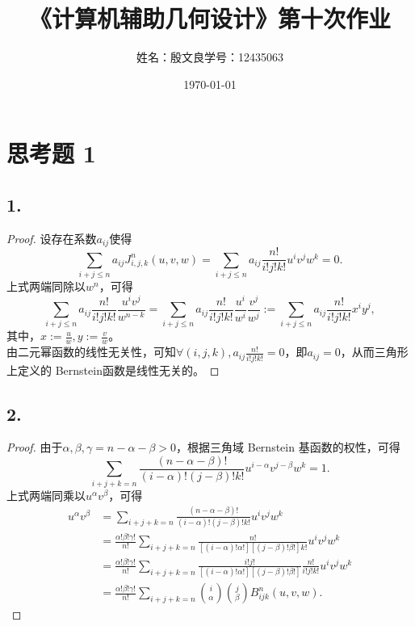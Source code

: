 \documentclass[utf8]{ctexart}
\title{《计算机辅助几何设计》第十次作业}
\author{姓名：殷文良\qquad 学号：12435063}
\date{\today}
\begin{document}
\maketitle
\section*{思考题 1}
\subsection*{1.}
\begin{proof}
    设存在系数$a_{ij}$使得
    $$
    \sum_{i+j\leq n}a_{ij}J_{i,j,k}^n(u,v,w) = \sum_{i+j\leq n}a_{ij}\frac{n!}{i!j!k!}u^iv^jw^k = 0.
    $$
    上式两端同除以$w^n$，可得
    $$
    \sum_{i+j\leq n}a_{ij}\frac{n!}{i!j!k!}\frac{u^iv^j}{w^{n-k}} = \sum_{i+j\leq n}a_{ij}\frac{n!}{i!j!k!}\frac{u^i}{w^{i}}\frac{v^j}{w^j} := \sum_{i+j\leq n}a_{ij}\frac{n!}{i!j!k!}x^iy^j,
    $$
    其中，$x := \frac{u}{w}, y := \frac{v}{w}$。\\
    由二元幂函数的线性无关性，可知$\forall (i,j,k), a_{ij}\frac{n!}{i!j!k!}=0$，即$a_{ij} = 0$，从而三角形上定义的
    Bernstein函数是线性无关的。
\end{proof}

\subsection*{2.}
\begin{proof}
    由于$\alpha,\beta,\gamma=n-\alpha-\beta>0$，根据三角域 Bernstein 基函数的权性，可得
    $$
    \sum_{i+j+k=n}\frac{(n-\alpha-\beta)!}{(i-\alpha)!(j-\beta)!k!}u^{i-\alpha}v^{j-\beta}w^k = 1.
    $$
    上式两端同乘以$u^{\alpha}v^{\beta}$，可得
    $$
    \begin{aligned}
        u^{\alpha}v^{\beta} &= \sum_{i+j+k=n}\frac{(n-\alpha-\beta)!}{(i-\alpha)!(j-\beta)!k!}u^{i}v^{j}w^k\\
        &= \frac{\alpha!\beta!\gamma!}{n!}\sum_{i+j+k=n}\frac{n!}{[(i-\alpha)!\alpha!][(j-\beta)!\beta!]k!}u^{i}v^{j}w^k\\
        &= \frac{\alpha!\beta!\gamma!}{n!}\sum_{i+j+k=n}\frac{i!j!}{[(i-\alpha)!\alpha!][(j-\beta)!\beta!]}\frac{n!}{i!j!k!}u^{i}v^{j}w^k\\
        &= \frac{\alpha!\beta!\gamma!}{n!}\sum_{i+j+k=n}\binom{i}{\alpha}\binom{j}{\beta}B_{ijk}^n(u,v,w).
    \end{aligned}
    $$
\end{proof}
\end{document}
